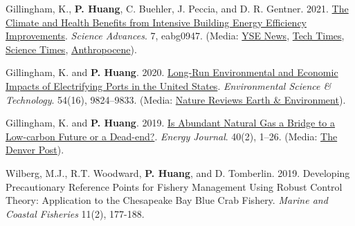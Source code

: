 



\begin{pubitems} %
	\item {Gillingham, K., \textbf{P. Huang}, C. Buehler, J. Peccia, and D. R. Gentner. 2021. \href{https://advances.sciencemag.org/content/7/34/eabg0947}{The Climate and Health Benefits from Intensive Building Energy Efficiency Improvements}. \textit{Science Advances}. 7, eabg0947. (Media: \href{https://environment.yale.edu/news/article/efficient-buildings-could-save-thousands-of-lives-in-us-every-year/}{YSE News}, \href{https://www.techtimes.com/articles/264430/20210822/new-energy-efficient-building-plans-unveiled-study-experts-believe-decrease.htm}{Tech Times}, \href{https://www.sciencetimes.com/articles/33000/20210823/energy-efficiency-buildings-decrease-thousands-premature-deaths-annually-according-study.htm}{Science Times}, \href{https://www.anthropocenemagazine.org/2021/08/researchers-calculated-how-many-lives-energy-efficient-buildings-could-save/}{Anthropocene}).}
    \item {Gillingham, K. and {\bf P. Huang}. 2020. \href{http://www.phuang.me/publication/2020-port-electrification}{Long-Run Environmental and Economic Impacts of Electrifying Ports in the United States}. \textit{Environmental Science \& Technology}. 54(16), 9824--9833. (Media: \href{https://www.nature.com/articles/s43017-020-0090-6}{Nature Reviews Earth \& Environment}).}
    \item {Gillingham, K. and {\bf P. Huang}. 2019. \href{https://www.iaee.org/en/Publications/ejarticle.aspx?id=3325}{Is Abundant Natural Gas a Bridge to a Low-carbon Future or a Dead-end?}. \textit{Energy Journal}. 40(2), 1--26. (Media: \href{https://www.denverpost.com/2020/01/31/colorado-natural-gas-bridge-fuel-wind-solar-xcel-tri-state/}{The Denver Post}).}
    \item {Wilberg, M.J., R.T. Woodward, {\bf P. Huang}, and D. Tomberlin. 2019. Developing Precautionary Reference Points for Fishery Management Using Robust Control Theory: Application to the Chesapeake Bay Blue Crab Fishery. \textit{Marine and Coastal Fisheries} 11(2), 177-188.}

\end{pubitems}
